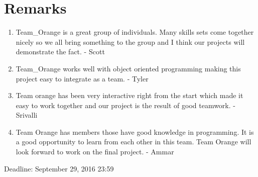 \documentclass [10pt] {article}
\begin{document}
\section{Remarks}
\begin{enumerate}
\item Team\_Orange is a great group of individuals.  Many skills sets come together nicely so we all bring something to the group and I think our projects will demonstrate the fact. - Scott
\item Team\_Orange works well with object oriented programming making this project easy to integrate as a team. - Tyler
\item Team orange has been very interactive right from the start which made it easy to work together and our project is the result of good teamwork. - Srivalli
\item Team Orange has members those have good knowledge in programming.  It is a good opportunity to learn from each other in this team.  Team Orange will look forward to work on the final project. - Ammar
\end{enumerate}

Deadline: September 29, 2016 23:59
\end{document}
